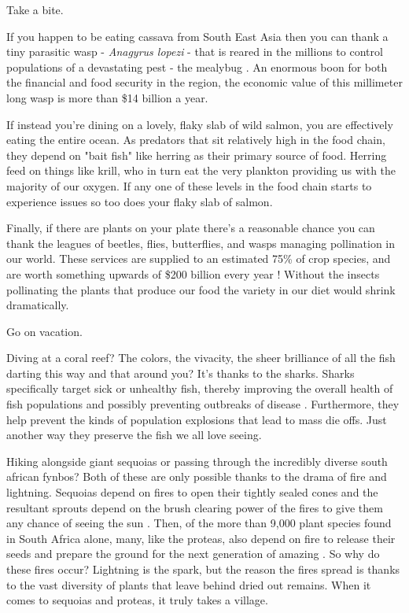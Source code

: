 \documentclass[11pt]{book}
\begin{document}
Take a bite. 
\newline 

If you happen to be eating cassava from South East Asia then you can thank a tiny parasitic wasp - \textit{Anagyrus lopezi} - that is reared in the millions to control populations of a devastating pest - the mealybug \cite{wpark}. An enormous boon for both the financial and food security in the region, the economic value of this millimeter long wasp is more than \$14 billion a year. 
\newline

If instead you're dining on a lovely, flaky slab of wild salmon, you are effectively eating the entire ocean. As predators that sit relatively high in the food chain, they depend on "bait fish" like herring as their primary source of food. Herring feed on things like krill, who in turn eat the very plankton providing us with the majority of our oxygen. If any one of these levels in the food chain starts to experience issues so too does your flaky slab of salmon. 
\newline

Finally, if there are plants on your plate there's a reasonable chance you can thank the leagues of beetles, flies, butterflies, and wasps managing pollination in our world. These services are supplied to an estimated 75\% of crop species, and are worth something upwards of \$200 billion every year \cite{avanbergen}! Without the insects pollinating the plants that produce our food the variety in our diet would shrink dramatically.
\newline

Go on vacation. 
\newline

Diving at a coral reef? The colors, the vivacity, the sheer brilliance of all the fish darting this way and that around you? It's thanks to the sharks. Sharks specifically target sick or unhealthy fish, thereby improving the overall health of fish populations and possibly preventing outbreaks of disease \cite{reefcause}. Furthermore, they help prevent the kinds of population explosions that lead to mass die offs. Just another way they preserve the fish we all love seeing. 
\newline

Hiking alongside giant sequoias or passing through the incredibly diverse south african fynbos? Both of these are only possible thanks to the drama of fire and lightning. Sequoias depend on fires to open their tightly sealed cones and the resultant sprouts depend on the brush clearing power of the fires to give them any chance of seeing the sun \cite{california}. Then, of the more than 9,000 plant species found in South Africa alone, many, like the proteas, also depend on fire to release their seeds and prepare the ground for the next generation of amazing \cite{shoek}. So why do these fires occur? Lightning is the spark, but the reason the fires spread is thanks to the vast diversity of plants that leave behind dried out remains. When it comes to sequoias and proteas, it truly takes a village. 
\newline
\end{document}

